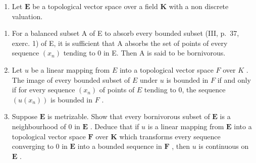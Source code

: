 \begin{enumerate}
\def\labelenumi{\arabic{enumi})}
\setcounter{enumi}{10}
\tightlist
\item
  Let \(\mathbf{E}\) be a topological vector space over a field \(\mathbf{K}\) with a non discrete valuation.
\end{enumerate}

\begin{enumerate}
\def\labelenumi{\alph{enumi})}
\item
  For a balanced subset A of E to absorb every bounded subset (III, p.~37, exerc. 1) of E, it is sufficient that A absorbs the set of points of every sequence \((x_{n})\) tending to 0 in E. Then A is said to be bornivorous.
\item
  Let \(u\) be a linear mapping from \(E\) into a topological vector space \(F\) over \(K\) . The image of every bounded subset of \(E\) under \(u\) is bounded in \(F\) if and only if for every sequence \((x_{n})\) of points of \(E\) tending to 0, the sequence \((u(x_{n}))\) is bounded in \(F\) .
\item
  Suppose \(\mathbf{E}\) is metrizable. Show that every bornivorous subset of \(\mathbf{E}\) is a neighbourhood of 0 in \(\mathbf{E}\) . Deduce that if \(u\) is a linear mapping from \(\mathbf{E}\) into a topological vector space \(\mathbf{F}\) over \(\mathbf{K}\) which transforms every sequence converging to 0 in \(\mathbf{E}\) into a bounded sequence in \(\mathbf{F}\) , then \(u\) is continuous on \(\mathbf{E}\) .
\end{enumerate}

